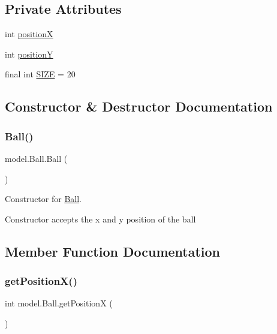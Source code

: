 \subsection*{Private Attributes}
\begin{DoxyCompactItemize}
\item 
int \hyperlink{classmodel_1_1_ball_a706c12dfbaabd03b8423ff2bdde0f5c9}{positionX}
\item 
int \hyperlink{classmodel_1_1_ball_aac5d95f10dd849f8cea43c34300d9649}{positionY}
\item 
final int \hyperlink{classmodel_1_1_ball_ad9a73bce4f016c2bd11fb037bac835c7}{S\+I\+ZE} = 20
\end{DoxyCompactItemize}


\subsection{Constructor \& Destructor Documentation}
\hypertarget{classmodel_1_1_ball_a525ba73a7ce62c810a501d6194402cfc}{}\label{classmodel_1_1_ball_a525ba73a7ce62c810a501d6194402cfc} 
\subsubsection{\texorpdfstring{Ball()}{Ball()}}
{\footnotesize\ttfamily model.\+Ball.\+Ball (\begin{DoxyParamCaption}{ }\end{DoxyParamCaption})}



Constructor for \hyperlink{classmodel_1_1_ball}{Ball}. 

Constructor accepts the x and y position of the ball 

\subsection{Member Function Documentation}
\hypertarget{classmodel_1_1_ball_ad6a8f2229d4bdb3dd755443000eeacdf}{}\label{classmodel_1_1_ball_ad6a8f2229d4bdb3dd755443000eeacdf} 
\subsubsection{\texorpdfstring{get\+Position\+X()}{getPositionX()}}
{\footnotesize\ttfamily int model.\+Ball.\+get\+PositionX (\begin{DoxyParamCaption}{ }\end{DoxyParamCaption})}



